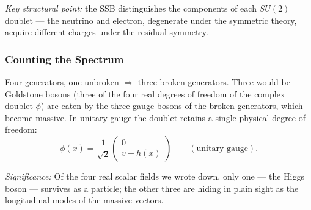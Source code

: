 
\textit{Key structural point:} the SSB distinguishes the components of each $SU(2)$ doublet --- the neutrino and electron, degenerate under the symmetric theory, acquire different charges under the residual symmetry.

\subsubsection*{Counting the Spectrum}

Four generators, one unbroken $\Rightarrow$ three broken generators. Three would-be Goldstone bosons (three of the four real degrees of freedom of the complex doublet $\phi$) are eaten by the three gauge bosons of the broken generators, which become massive. In unitary gauge the doublet retains a single physical degree of freedom:
\begin{equation}
  \boxed{\;\phi(x)=\frac{1}{\sqrt2}\begin{pmatrix}0\\ v+h(x)\end{pmatrix}
  \qquad(\text{unitary gauge}).\;}
  \label{eq:lec17:lsm_unitary}
\end{equation}

\textit{Significance:} Of the four real scalar fields we wrote down, only one --- the Higgs boson --- survives as a particle; the other three are hiding in plain sight as the longitudinal modes of the massive vectors.

